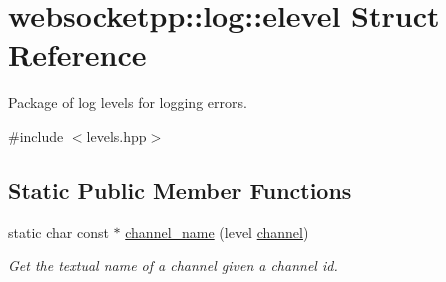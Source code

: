 \hypertarget{structwebsocketpp_1_1log_1_1elevel}{}\section{websocketpp\+:\+:log\+:\+:elevel Struct Reference}
\label{structwebsocketpp_1_1log_1_1elevel}


Package of log levels for logging errors.  




{\ttfamily \#include $<$levels.\+hpp$>$}

\subsection*{Static Public Member Functions}
\begin{DoxyCompactItemize}
\item 
static char const  $\ast$ \mbox{\hyperlink{structwebsocketpp_1_1log_1_1elevel_ac8eb65399a2ea6b782e0265a44618c0e}{channel\+\_\+name}} (level \mbox{\hyperlink{classchannel}{channel}})
\begin{DoxyCompactList}\small\item\em Get the textual name of a channel given a channel id. \end{DoxyCompactList}\end{DoxyCompactItemize}
